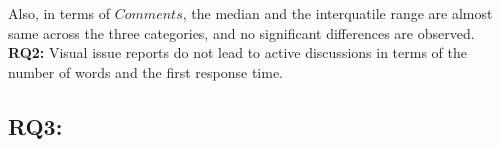 Also, in terms of $Comments$, the median and the interquatile range are almost same across the three categories, and no significant differences are observed. 
\summarybox
{{\bf RQ2: }{
    Visual issue reports do not lead to active discussions in terms of the number of words and the first response time. 
}}
\subsection*{RQ3: \RQthree{}}



